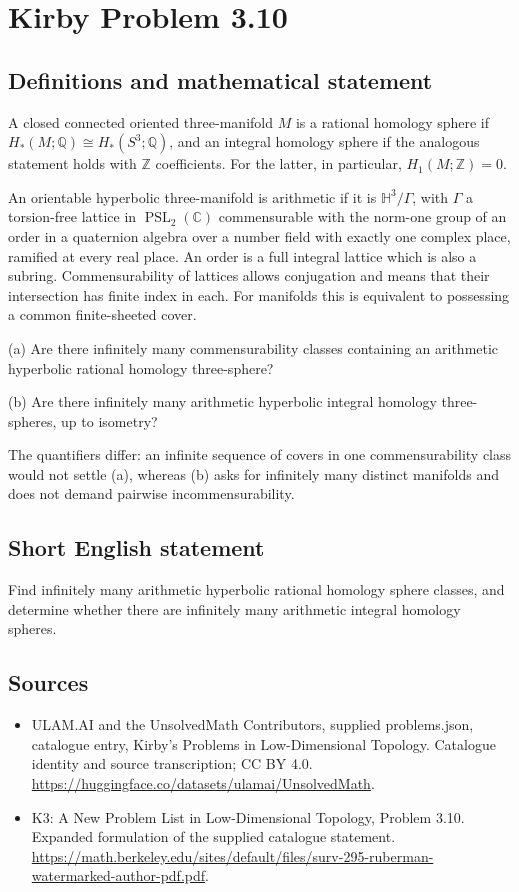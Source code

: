 \documentclass[11pt,a4paper]{article}
\begin{document}
\section*{Kirby Problem 3.10}\label{statement}

\subsection{Definitions and mathematical statement}
A closed connected oriented three-manifold $M$ is a rational homology sphere
if $H_*(M;\mathbb Q)\cong H_*(S^3;\mathbb Q)$, and an integral homology sphere
if the analogous statement holds with $\mathbb Z$ coefficients.
For the latter, in particular, $H_1(M;\mathbb Z)=0$.

An orientable hyperbolic three-manifold is arithmetic if it is
$\mathbb H^3/\Gamma$, with $\Gamma$ a torsion-free lattice in
$\operatorname{PSL}_2(\mathbb C)$ commensurable with the norm-one group of
an order in a quaternion algebra over a number field with exactly one complex
place, ramified at every real place. An order is a full integral lattice which
is also a subring. Commensurability of lattices allows conjugation and means
that their intersection has finite index in each. For manifolds this is
equivalent to possessing a common finite-sheeted cover.

(a) Are there infinitely many commensurability classes containing an
arithmetic hyperbolic rational homology three-sphere?

(b) Are there infinitely many arithmetic hyperbolic integral homology
three-spheres, up to isometry?

The quantifiers differ: an infinite sequence of covers in one commensurability
class would not settle (a), whereas (b) asks for infinitely many distinct
manifolds and does not demand pairwise incommensurability.
\subsection{Short English statement}
Find infinitely many arithmetic hyperbolic rational homology sphere classes, and determine whether there are infinitely many arithmetic integral homology spheres.
\subsection{Sources}
\begin{itemize}
\item[S1] ULAM.AI and the UnsolvedMath Contributors, supplied problems.json, catalogue entry, Kirby's Problems in Low-Dimensional Topology. Catalogue identity and source transcription; CC BY 4.0.
\url{https://huggingface.co/datasets/ulamai/UnsolvedMath}.
\item[S2] K3: A New Problem List in Low-Dimensional Topology, Problem 3.10. Expanded formulation of the supplied catalogue statement.
\url{https://math.berkeley.edu/sites/default/files/surv-295-ruberman-watermarked-author-pdf.pdf}.
\end{itemize}
\end{document}
